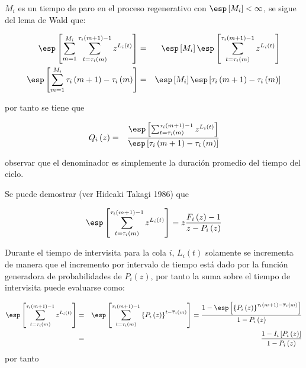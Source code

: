 $M_{i}$ es un tiempo de paro en el proceso regenerativo con $\esp\left[M_{i}\right]<\infty$, se sigue del lema de Wald que:


\begin{eqnarray*}
\esp\left[\sum_{m=1}^{M_{i}}\sum_{t=\tau_{i}\left(m\right)}^{\tau_{i}\left(m+1\right)-1}z^{L_{i}\left(t\right)}\right]&=&\esp\left[M_{i}\right]\esp\left[\sum_{t=\tau_{i}\left(m\right)}^{\tau_{i}\left(m+1\right)-1}z^{L_{i}\left(t\right)}\right]\\
\esp\left[\sum_{m=1}^{M_{i}}\tau_{i}\left(m+1\right)-\tau_{i}\left(m\right)\right]&=&\esp\left[M_{i}\right]\esp\left[\tau_{i}\left(m+1\right)-\tau_{i}\left(m\right)\right]
\end{eqnarray*}

por tanto se tiene que


\begin{eqnarray*}
Q_{i}\left(z\right)&=&\frac{\esp\left[\sum_{t=\tau_{i}\left(m\right)}^{\tau_{i}\left(m+1\right)-1}z^{L_{i}\left(t\right)}\right]}{\esp\left[\tau_{i}\left(m+1\right)-\tau_{i}\left(m\right)\right]}
\end{eqnarray*}

observar que el denominador es simplemente la duraci\'on promedio del tiempo del ciclo.


Se puede demostrar (ver Hideaki Takagi 1986) que

\begin{eqnarray*}
\esp\left[\sum_{t=\tau_{i}\left(m\right)}^{\tau_{i}\left(m+1\right)-1}z^{L_{i}\left(t\right)}\right]=z\frac{F_{i}\left(z\right)-1}{z-P_{i}\left(z\right)}
\end{eqnarray*}

Durante el tiempo de intervisita para la cola $i$, $L_{i}\left(t\right)$ solamente se incrementa de manera que el incremento por intervalo de tiempo est\'a dado por la funci\'on generadora de probabilidades de $P_{i}\left(z\right)$, por tanto la suma sobre el tiempo de intervisita puede evaluarse como:

\begin{eqnarray*}
\esp\left[\sum_{t=\tau_{i}\left(m\right)}^{\tau_{i}\left(m+1\right)-1}z^{L_{i}\left(t\right)}\right]&=&\esp\left[\sum_{t=\tau_{i}\left(m\right)}^{\tau_{i}\left(m+1\right)-1}\left\{P_{i}\left(z\right)\right\}^{t-\overline{\tau}_{i}\left(m\right)}\right]=\frac{1-\esp\left[\left\{P_{i}\left(z\right)\right\}^{\tau_{i}\left(m+1\right)-\overline{\tau}_{i}\left(m\right)}\right]}{1-P_{i}\left(z\right)}\\
&=&\frac{1-I_{i}\left[P_{i}\left(z\right)\right]}{1-P_{i}\left(z\right)}
\end{eqnarray*}
por tanto

